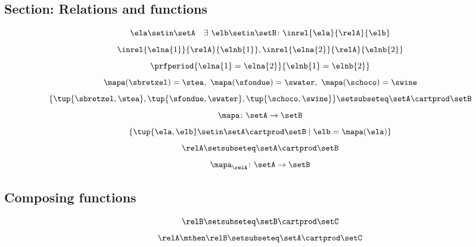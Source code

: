 \begin{forslides}
\subsection{Section: Relations and functions}  

 \begin{equation}\label{eq:slides_session2_99}
\ela \setin \setA \quad \exists \ \elb \setin \setB\colon  \inrel{\ela}{\relA}{\elb}
\end{equation}
\begin{equation}\label{eq:slides_session2_100}
\inrel{\elna{1}}{\relA}{\elnb{1}}, \inrel{\elna{2}}{\relA}{\elnb{2}}
\end{equation}
 \begin{equation}\label{eq:slides_session2_101}
\prfperiod{\elna{1} = \elna{2}}{\elnb{1} = \elnb{2}}
\end{equation}
\begin{equation}\label{eq:slides_session2_102}
\mapa (\sbretzel) = \stea, \ \mapa (\sfondue) = \swater, \ \mapa(\schoco) = \swine
\end{equation}
 \begin{equation}\label{eq:slides_session2_103}
\{ \tup{\sbretzel, \stea}, \tup{\sfondue, \swater}, \tup{\schoco, \swine} \} \setsubseteq \setA \cartprod \setB
\end{equation}
\begin{equation}\label{eq:slides_session2_104}
\mapa \colon \setA \to \setB
\end{equation}
 \begin{equation}\label{eq:slides_session2_105}
 \{ \tup{\ela,\elb} \setin \setA \cartprod \setB \mid \elb= \mapa(\ela) \}
\end{equation}
\begin{equation}\label{eq:slides_session2_106}
\relA \setsubseteq \setA \cartprod \setB
\end{equation}
 \begin{equation}\label{eq:slides_session2_107}
\mapa_\relA \colon \setA \to \setB
\end{equation}

\subsection{Composing functions}

\begin{equation}\label{eq:slides_session2_108}
\relB \setsubseteq \setB \cartprod \setC
\end{equation}
 \begin{equation}\label{eq:slides_session2_109}
\relA \mthen \relB \setsubseteq \setA \cartprod \setC
\end{equation}


\end{forslides}
